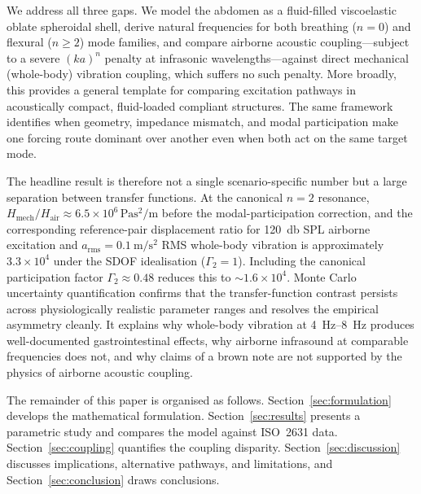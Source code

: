 We address all three gaps.  We model the abdomen as a fluid-filled
viscoelastic oblate spheroidal shell, derive natural frequencies for both
breathing ($n=0$) and flexural ($n \geq 2$) mode families, and compare
airborne acoustic coupling---subject to a severe $(ka)^n$ penalty at
infrasonic wavelengths---against direct mechanical (whole-body) vibration
coupling, which suffers no such penalty.  More broadly, this provides a
general template for comparing excitation pathways in acoustically compact,
fluid-loaded compliant structures.  The same framework identifies when
geometry, impedance mismatch, and modal participation make one forcing route
dominant over another even when both act on the same target mode.

The headline result is therefore not a single scenario-specific number but a
large separation between transfer functions.  At the canonical $n=2$
resonance, $H_\mathrm{mech}/H_\mathrm{air}
\approx 6.5 \times 10^6\,\si{\pascal\second\squared\per\metre}$ before the
modal-participation correction, and the corresponding reference-pair
displacement ratio for \SI{120}{\decibel} SPL airborne excitation and
$a_\mathrm{rms} = \SI{0.1}{\metre\per\second\squared}$ RMS whole-body
vibration is approximately $3.3 \times 10^4$ under the SDOF idealisation
($\Gamma_2 = 1$).  Including the canonical participation factor
$\Gamma_2 \approx 0.48$ reduces this to $\sim 1.6 \times 10^4$.  Monte Carlo
uncertainty quantification confirms that the transfer-function contrast
persists across physiologically realistic parameter ranges and resolves the
empirical asymmetry cleanly.  It explains why whole-body vibration at
\SIrange{4}{8}{\hertz} produces well-documented gastrointestinal effects, why
airborne infrasound at comparable frequencies does not, and why claims of a
brown note are not supported by the physics of airborne acoustic coupling.

The remainder of this paper is organised as follows.
Section~\ref{sec:formulation} develops the mathematical formulation.
Section~\ref{sec:results} presents a parametric study and compares the model
against ISO~2631 data.  Section~\ref{sec:coupling} quantifies the coupling
disparity.  Section~\ref{sec:discussion} discusses implications, alternative
pathways, and limitations, and Section~\ref{sec:conclusion} draws conclusions.
